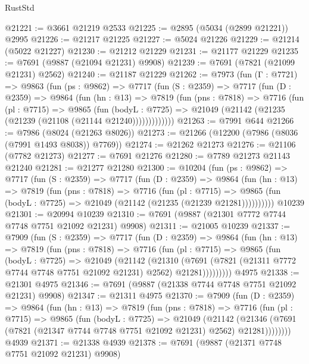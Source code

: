 \begin{lexlean}{RustStd}
\begin{coremodule}
@21221 := @3661 @21219 @2533
@21225 := @2895 (@5034 (@2899 @21221)) @2995
@21226 := @21217 @21225
@21227 := @5024 @21226
@21229 := @21214 (@5022 @21227)
@21230 := @21212 @21229
@21231 := @21177 @21229
@21235 := @7691 (@9887 (@21094 @21231) @9908)
@21239 := @7691 (@7821 (@21099 @21231) @2562)
@21240 := @21187 @21229
@21262 := @7973
    (fun (Γ : @7721) =>
    @9863
      (fun (ps : @9862) =>
      @7717
        (fun (S : @2359) =>
        @7717
          (fun (D : @2359) =>
          @9864
            (fun (hn : @13) =>
            @7819
              (fun (pns : @7818) =>
              @7716
                (fun (pl : @7715) =>
                @9865
                  (fun (bodyL : @7725) =>
                  @21049 (@21142 (@21235 (@21239 (@21108 (@21144 @21240)))))))))))))
@21263 := @7991 @644
@21266 := @7986 (@8024 (@21263 @8026))
@21273 := @21266 (@12200 (@7986 (@8036 (@7991 @1493 @8038)) @7769))
@21274 := @21262 @21273
@21276 := @21106 (@7782 @21273)
@21277 := @7691 @21276
@21280 := @7789 @21273 @21143 @21240
@21281 := @21277 @21280
@21300 := @10204
    (fun (ps : @9862) =>
    @7717
      (fun (S : @2359) =>
      @7717
        (fun (D : @2359) =>
        @9864
          (fun (hn : @13) =>
          @7819
            (fun (pns : @7818) =>
            @7716
              (fun (pl : @7715) =>
              @9865 (fun (bodyL : @7725) => @21049 (@21142 (@21235 (@21239 @21281))))))))))
    @10239
@21301 := @20994 @10239
@21310 := @7691 (@9887 (@21301 @7772 @7744 @7748 @7751 @21092 @21231) @9908)
@21311 := @21005 @10239
@21337 := @7909
    (fun (S : @2359) =>
    @7717
      (fun (D : @2359) =>
      @9864
        (fun (hn : @13) =>
        @7819
          (fun (pns : @7818) =>
          @7716
            (fun (pl : @7715) =>
            @9865
              (fun (bodyL : @7725) =>
              @21049
                (@21142
                  (@21310
                    (@7691
                      (@7821 (@21311 @7772 @7744 @7748 @7751 @21092 @21231) @2562)
                      @21281)))))))))
    @4975
@21338 := @21301 @4975
@21346 := @7691 (@9887 (@21338 @7744 @7748 @7751 @21092 @21231) @9908)
@21347 := @21311 @4975
@21370 := @7909
    (fun (D : @2359) =>
    @9864
      (fun (hn : @13) =>
      @7819
        (fun (pns : @7818) =>
        @7716
          (fun (pl : @7715) =>
          @9865
            (fun (bodyL : @7725) =>
            @21049
              (@21142
                (@21346 (@7691 (@7821 (@21347 @7744 @7748 @7751 @21092 @21231) @2562) @21281))))))))
    @4939
@21371 := @21338 @4939
@21378 := @7691 (@9887 (@21371 @7748 @7751 @21092 @21231) @9908)

\end{coremodule}
\end{lexlean}

